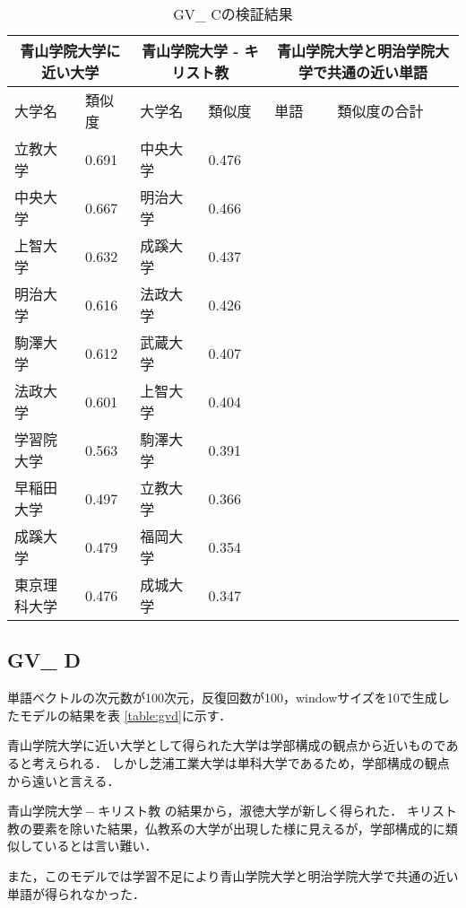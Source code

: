 \begin{table}[H]
\caption{GV\_ Cの検証結果}
\centering
\footnotesize
\begin{tabular}{ll|ll|ll}
\hline
\multicolumn{2}{c}{青山学院大学に近い大学} & \multicolumn{2}{c}{青山学院大学 - キリスト教} & \multicolumn{2}{c}{青山学院大学と明治学院大学で共通の近い単語}
\\ \hline
大学名 & 類似度 & 大学名 & 類似度 & 単語 & 類似度の合計
\\ \hline \hline
立教大学 & 0.691 & 中央大学 & 0.476 & & \\
中央大学 & 0.667 & 明治大学 & 0.466 & & \\
上智大学 & 0.632 & 成蹊大学 & 0.437 & & \\
明治大学 & 0.616 & 法政大学 & 0.426 & & \\
駒澤大学 & 0.612 & 武蔵大学 & 0.407 & & \\
法政大学 & 0.601 & 上智大学 & 0.404 & & \\
学習院大学 & 0.563 & 駒澤大学 & 0.391 & & \\
早稲田大学 & 0.497 & 立教大学 & 0.366 & & \\
成蹊大学 & 0.479 & 福岡大学 & 0.354 & & \\
東京理科大学 & 0.476 & 成城大学 & 0.347 & & \\ \hline
\end{tabular}
\label{table:gvc}
\end{table}

\subsection{GV\_ D}
単語ベクトルの次元数が100次元，反復回数が100，windowサイズを10で生成したモデルの結果を表 \ref{table:gvd}に示す．

青山学院大学に近い大学として得られた大学は学部構成の観点から近いものであると考えられる．
しかし芝浦工業大学は単科大学であるため，学部構成の観点から遠いと言える．

$ 青山学院大学 - キリスト教 $ の結果から，淑徳大学が新しく得られた．
キリスト教の要素を除いた結果，仏教系の大学が出現した様に見えるが，学部構成的に類似しているとは言い難い．

また，このモデルでは学習不足により青山学院大学と明治学院大学で共通の近い単語が得られなかった．

